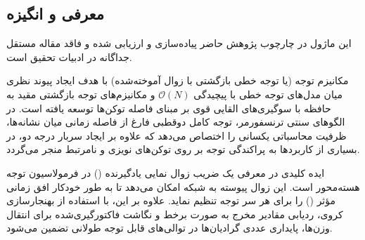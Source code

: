 \subsection{معرفی و انگیزه}
این ماژول در چارچوب پژوهش حاضر پیاده‌سازی و ارزیابی شده و فاقد مقاله مستقل جداگانه در ادبیات تحقیق است.

مکانیزم توجه  (یا توجه خطی بازگشتی با زوال آموخته‌شده) با هدف ایجاد پیوند نظری میان مدل‌های توجه خطی با پیچیدگی $\mathcal{O}(N)$ و مکانیزم‌های توجه بازگشتی مقید به حافظه با سوگیری‌های القایی قوی بر مبنای فاصله توکن‌ها توسعه یافته است. در الگوهای سنتی ترنسفورمر، توجه کامل دوقطبی فارغ از فاصله زمانی میان نشانه‌ها، ظرفیت محاسباتی یکسانی را اختصاص می‌دهد که علاوه بر ایجاد سربار درجه دو، در بسیاری از کاربردها به پراکندگی توجه بر روی توکن‌های نویزی و نامرتبط منجر می‌گردد.

ایده کلیدی در  معرفی یک ضریب زوال نمایی یادگیرنده () در فرمولاسیون توجه هسته‌محور است. این زوال پیوسته به شبکه امکان می‌دهد تا به طور خودکار افق زمانی مؤثر () را برای هر سر توجه تنظیم نماید. علاوه بر این، با استفاده از بهنجارسازی کروی، ردیابی مقادیر مخرج به صورت برخط و نگاشت فاکتورگیری‌شده  برای انتقال وزن‌ها، پایداری عددی گرادیان‌ها در توالی‌های قابل توجه طولانی تضمین می‌شود.
